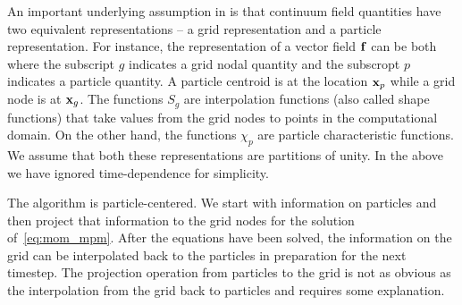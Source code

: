 An important underlying assumption in \MPM is that
continuum field quantities have two equivalent representations -- a grid representation and
a particle representation.  For instance, the representation of a vector field $\mathbf{f}$ can be both 
\Beq \label{eq:mpm_rep}
    \quad \Tand \quad
\Eeq
where the subscript $g$ indicates a grid nodal quantity and the subscropt $p$ indicates a
particle quantity.  A particle centroid is at the location $\mathbf{x}_p$ while a grid node is
at $\mathbf{x}_g$.  The functions $S_g$ are interpolation functions (also called shape functions)
that take values from the grid nodes to points in the computational domain.  On the
other hand, the functions $\chi_p$ are particle characteristic functions.  We assume that
both these representations are partitions of unity.  In the above we have ignored time-dependence
for simplicity.

The \MPM algorithm is particle-centered. We start with information on particles and
then project that information to the grid nodes for the solution of~\eqref{eq:mom_mpm}.  After
the equations have been solved, the information on the grid can be interpolated back to
the particles in preparation for the next timestep. The projection operation from
particles to the grid is not as obvious as the interpolation from the grid back to particles
and requires some explanation.

